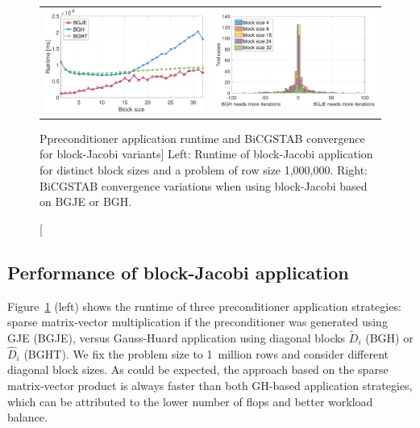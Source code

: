 \begin{figure}[t]
\begin{center}
\begin{tabular}{ll}
\includegraphics[width=.45\columnwidth]{plots/app_dgebjp_setup_P100_spmv_gh_ght_apply_fixed.pdf}
&
\includegraphics[width=.49\columnwidth]{plots/iteration_distribution}\\
\end{tabular}
\end{center}
\caption
[Ppreconditioner application runtime and BiCGSTAB convergence for block-Jacobi
variants]
{
Left: Runtime of block-Jacobi application for distinct block sizes and a problem of row size 1,000,000.
Right: BiCGSTAB convergence variations when using block-Jacobi based on 
BGJE or BGH.
}
\label{2017-gh-block-jacobi:fig:app_performance}
\end{figure}



\subsection{Performance of block-Jacobi application}
Figure~\ref{2017-gh-block-jacobi:fig:app_performance} (left) shows the runtime
of three preconditioner application strategies:
sparse matrix-vector multiplication if the preconditioner was generated using GJE (BGJE),
versus Gauss-Huard application using diagonal blocks $\widetilde{D}_i$ (BGH)
or $\hat{D}_i$ (BGHT).
We fix the problem size to 1~million rows and consider different diagonal block sizes.
As could be expected, the approach based on the sparse matrix-vector product 
is always faster than both GH-based application strategies,
which can be attributed to the lower number of flops
and better workload balance.

